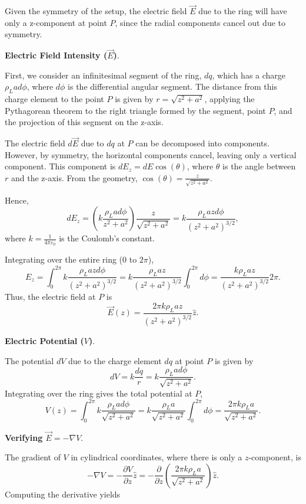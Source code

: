 \documentclass[12pt]{article}
\begin{document}
Given the symmetry of the setup, the electric field \(\vec{E}\) due to the ring will have only a z-component at point \(P\), since the radial components cancel out due to symmetry. 

\textbf{Electric Field Intensity (\(\vec{E}\))}.

First, we consider an infinitesimal segment of the ring, \(dq\), which has a charge \(\rho_L a d\phi\), where \(d\phi\) is the differential angular segment. The distance from this charge element to the point \(P\) is given by \(r = \sqrt{z^2 + a^2}\), applying the Pythagorean theorem to the right triangle formed by the segment, point \(P\), and the projection of this segment on the z-axis.

The electric field \(d\vec{E}\) due to \(dq\) at \(P\) can be decomposed into components. However, by symmetry, the horizontal components cancel, leaving only a vertical component. This component is \(dE_z = dE \cos(\theta)\), where \(\theta\) is the angle between \(r\) and the z-axis. From the geometry, \(\cos(\theta) = \frac{z}{\sqrt{z^2 + a^2}}\).

Hence,
\[
dE_z = \left(k \frac{\rho_L a d\phi}{z^2+a^2}\right)\frac{z}{\sqrt{z^2 + a^2}} = k \frac{\rho_L a z d\phi}{(z^2+a^2)^{3/2}},
\]
where \(k = \frac{1}{4\pi\varepsilon_0}\) is the Coulomb's constant.

Integrating over the entire ring (\(0\) to \(2\pi\)),
\[
E_z = \int_0^{2\pi} k \frac{\rho_L a z d\phi}{(z^2+a^2)^{3/2}} =k \frac{\rho_L a z}{(z^2+a^2)^{3/2}} \int_0^{2\pi} d\phi= \frac{k \rho_L a z}{(z^2+a^2)^{3/2}} 2\pi.
\]
Thus, the electric field at \(P\) is
\[
\vec{E}(z) = \frac{2 \pi k \rho_L a z}{(z^2+a^2)^{3/2}} \hat{z}.
\]

\textbf{Electric Potential (\(V\))}.

The potential \(dV\) due to the charge element \(dq\) at point \(P\) is given by
\[
dV = k \frac{dq}{r} = k \frac{\rho_L a d\phi}{\sqrt{z^2+a^2}}.
\]
Integrating over the ring gives the total potential at \(P\),
\[
V(z) = \int_0^{2\pi} k \frac{\rho_L a d\phi}{\sqrt{z^2+a^2}} =k \frac{\rho_L a}{\sqrt{z^2+a^2}} \int_0^{2\pi} d\phi= \frac{2\pi k \rho_L a}{\sqrt{z^2+a^2}}.
\]


\textbf{Verifying \(\vec{E} = -\nabla V\)}.

The gradient of \(V\) in cylindrical coordinates, where there is only a \(z\)-component, is
\[
-\nabla V = -\frac{\partial V}{\partial z} \hat{z} = -\frac{\partial}{\partial z}\left(\frac{2\pi k \rho_L a}{\sqrt{z^2+a^2}}\right) \hat{z}.
\]
Computing the derivative yields
\end{document}
